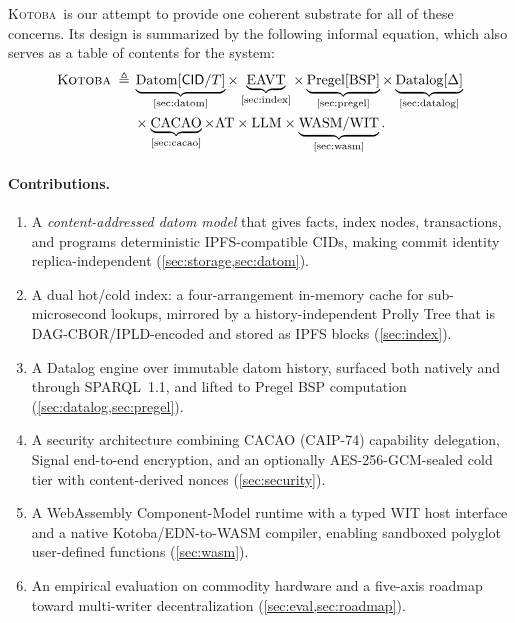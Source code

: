 \documentclass[11pt]{article}
\newcommand{\kotoba}{\textsc{Kotoba}}
\newcommand{\cid}{\textsf{CID}}
\newcommand{\eq}{\;\triangleq\;}
\begin{document}
\kotoba\ is our attempt to provide one coherent substrate for all of these
concerns. Its design is summarized by the following informal equation, which
also serves as a table of contents for the system:
%
\begin{equation}
\label{eq:kotoba}
\begin{aligned}
\kotoba \eq&
\underbrace{\mathrm{Datom}[\cid/T]}_{\text{\cref{sec:datom}}}
\times
\underbrace{\mathrm{EAVT}}_{\text{\cref{sec:index}}}
\times
\underbrace{\mathrm{Pregel}[\mathrm{BSP}]}_{\text{\cref{sec:pregel}}}
\times
\underbrace{\mathrm{Datalog}[\Delta]}_{\text{\cref{sec:datalog}}}
\\
&\times
\underbrace{\mathrm{CACAO}}_{\text{\cref{sec:cacao}}}
\times
\mathrm{AT}
\times
\mathrm{LLM}
\times
\underbrace{\mathrm{WASM/WIT}}_{\text{\cref{sec:wasm}}}.
\end{aligned}
\end{equation}

\paragraph{Contributions.}
\begin{enumerate}[leftmargin=1.4em,itemsep=2pt]
  \item A \emph{content-addressed datom model} that gives facts, index nodes,
    transactions, and programs deterministic IPFS-compatible \cid{}s, making
    commit identity replica-independent
    (\cref{sec:storage,sec:datom}).
  \item A dual hot/cold index: a four-arrangement in-memory cache for
    sub-microsecond lookups, mirrored by a history-independent Prolly Tree that
    is DAG-CBOR/IPLD-encoded and stored as IPFS blocks (\cref{sec:index}).
  \item A Datalog engine over immutable datom history, surfaced both natively
    and through SPARQL~1.1, and lifted to Pregel BSP computation
    (\cref{sec:datalog,sec:pregel}).
  \item A security architecture combining CACAO (CAIP-74) capability delegation,
    Signal end-to-end encryption, and an optionally AES-256-GCM-sealed cold tier
    with content-derived nonces (\cref{sec:security}).
  \item A WebAssembly Component-Model runtime with a typed WIT host interface and
    a native Kotoba/EDN-to-WASM compiler, enabling sandboxed polyglot user-defined
    functions (\cref{sec:wasm}).
  \item An empirical evaluation on commodity hardware and a five-axis roadmap
    toward multi-writer decentralization (\cref{sec:eval,sec:roadmap}).
\end{enumerate}
\end{document}
